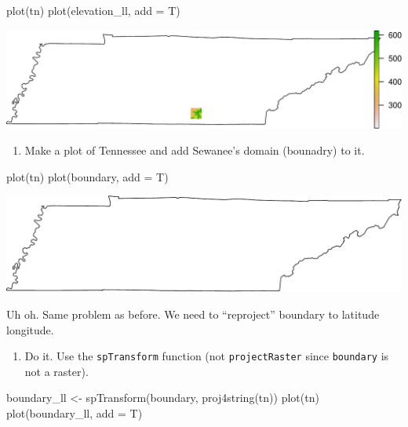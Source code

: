 \documentclass[
]{book}
\newenvironment{Shaded}{\begin{snugshade}}{\end{snugshade}}
\newcommand{\AttributeTok}[1]{\textcolor[rgb]{0.77,0.63,0.00}{#1}}
\newcommand{\FunctionTok}[1]{\textcolor[rgb]{0.00,0.00,0.00}{#1}}
\newcommand{\NormalTok}[1]{#1}
\newcommand{\OtherTok}[1]{\textcolor[rgb]{0.56,0.35,0.01}{#1}}
\providecommand{\tightlist}{%
  \setlength{\itemsep}{0pt}\setlength{\parskip}{0pt}}
\begin{document}
\begin{Shaded}
\begin{Highlighting}[]
\FunctionTok{plot}\NormalTok{(tn)}
\FunctionTok{plot}\NormalTok{(elevation\_ll, }\AttributeTok{add =}\NormalTok{ T)}
\end{Highlighting}
\end{Shaded}

\includegraphics{figures/unnamed-chunk-427-1.pdf}

\begin{enumerate}
\def\labelenumi{\arabic{enumi}.}
\setcounter{enumi}{19}
\tightlist
\item
  Make a plot of Tennessee and add Sewanee's domain (bounadry) to it.
\end{enumerate}

\begin{Shaded}
\begin{Highlighting}[]
\FunctionTok{plot}\NormalTok{(tn)}
\FunctionTok{plot}\NormalTok{(boundary, }\AttributeTok{add =}\NormalTok{ T)}
\end{Highlighting}
\end{Shaded}

\includegraphics{figures/unnamed-chunk-428-1.pdf}

Uh oh. Same problem as before. We need to ``reproject'' boundary to latitude longitude.

\begin{enumerate}
\def\labelenumi{\arabic{enumi}.}
\setcounter{enumi}{20}
\tightlist
\item
  Do it. Use the \texttt{spTransform} function (not \texttt{projectRaster} since \texttt{boundary} is not a raster).
\end{enumerate}

\begin{Shaded}
\begin{Highlighting}[]
\NormalTok{boundary\_ll }\OtherTok{\textless{}{-}} \FunctionTok{spTransform}\NormalTok{(boundary, }\FunctionTok{proj4string}\NormalTok{(tn))}
\FunctionTok{plot}\NormalTok{(tn)}
\FunctionTok{plot}\NormalTok{(boundary\_ll, }\AttributeTok{add =}\NormalTok{ T)}
\end{Highlighting}
\end{Shaded}
\end{document}
